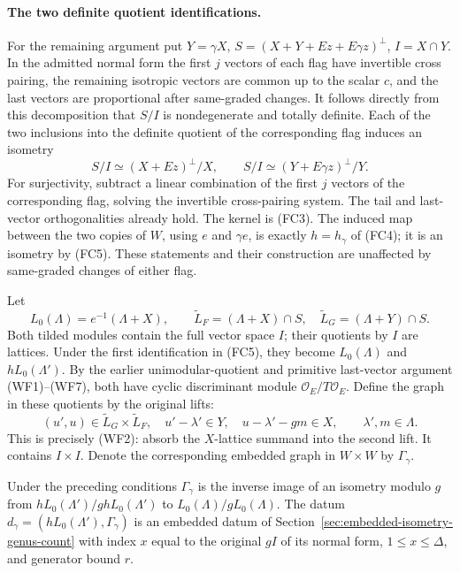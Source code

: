 \paragraph{The two definite quotient identifications.}
For the remaining argument put \(Y=\gamma X\),
\(S=(X+Y+Ez+E\gamma z)^\perp\), \(I=X\cap Y\).
In the admitted normal form the first \(j\) vectors of
each flag have invertible cross pairing, the remaining
isotropic vectors are common up to the scalar \(c\), and
the last vectors are proportional after same-graded changes.
It follows directly from this decomposition that \(S/I\)
is nondegenerate and totally definite.  Each of the two
inclusions into the definite quotient of the corresponding
flag induces an isometry
\[
 S/I\simeq (X+Ez)^\perp/X,\qquad
 S/I\simeq (Y+E\gamma z)^\perp/Y.                    \tag{FC5}
\]
For surjectivity, subtract a linear combination of the
first \(j\) vectors of the corresponding flag, solving the
invertible cross-pairing system.  The tail and last-vector
orthogonalities already hold.  The kernel is (FC3).
The induced map between the two copies of \(W\), using
\(e\) and \(\gamma e\), is exactly \(h=h_\gamma\)
of (FC4); it is an isometry by (FC5).
These statements and their construction are unaffected
by same-graded changes of either flag.

Let
\[
 L_0(\Lambda)=e^{-1}(\Lambda+X),\qquad
 \widetilde L_F=(\Lambda+X)\cap S,\quad
 \widetilde L_G=(\Lambda+Y)\cap S.
\]
Both tilded modules contain the full vector space \(I\);
their quotients by \(I\) are lattices.
Under the first identification in (FC5), they become
\(L_0(\Lambda)\) and \(hL_0(\Lambda')\).
By the earlier unimodular-quotient and primitive
last-vector argument (WF1)--(WF7), both have cyclic
discriminant module \(\mathcal O_E/T\mathcal O_E\).
Define the graph in these quotients by the original lifts:
\[
 (u',u)\in\widetilde L_G\times\widetilde L_F,\quad
 u'-\lambda'\in Y,\quad u-\lambda'-gm\in X,
 \qquad \lambda',m\in\Lambda .                         \tag{FC6}
\]
This is precisely (WF2): absorb the \(X\)-lattice summand
into the second lift.  It contains \(I\times I\).
Denote the corresponding embedded graph in \(W\times W\)
by \(\Gamma_\gamma\).

\begin{lemma}
\label{lem:flag-embedded-graph}
Under the preceding conditions \(\Gamma_\gamma\) is the
inverse image of an isometry modulo \(g\) from
\(hL_0(\Lambda')/g hL_0(\Lambda')\) to
\(L_0(\Lambda)/gL_0(\Lambda)\).
The datum
\(d_\gamma=(hL_0(\Lambda'),\Gamma_\gamma)\)
is an embedded datum of Section~\ref{sec:embedded-isometry-genus-count}
with index \(x\) equal to the original \(gI\) of its
normal form, \(1\le x\le\Delta\), and generator bound \(r\).
\end{lemma}

